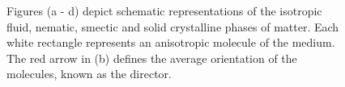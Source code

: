 \begin{figure}
\begin{center}
\hspace{0.5cm}
\hspace{0.5cm}
\hspace{0.5cm}
\hspace{0.5cm}
\end{center}
\caption[Schematic depiction of various liquid crystalline phases]{\label{fig:phases}Figures (a - d) depict schematic representations of the isotropic fluid, nematic, smectic and solid crystalline phases of matter. Each white rectangle represents an anisotropic molecule of the medium. The red arrow in (b) defines the average orientation of the molecules, known as the director.}
\end{figure}

